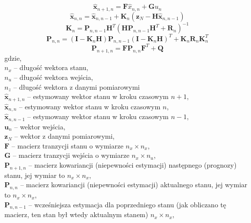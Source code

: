 {{{        \begin{equation}
            \hat{\bm{x}}_{n+1,n}= \bm{F} \hat{x}_{n,n} + \bm{G}u_n
        \end{equation}
        \begin{equation}
            \hat{\bm{x}}_{n,n}=\hat{\bm{x}}_{n,n-1}+\bm{K}_n(\bm{z}_N - \bm{H}\hat{\bm{x}}_{n,n-1})
        \end{equation}
        \begin{equation}
            \bm{K}_n=\bm{P}_{n,n-1} \bm{H}^T(\bm{H}\bm{P}_{n,n-1}\bm{H}^T +\bm{R}_n)^{-1}
        \end{equation}
        \begin{equation}
            \bm{P}_{n,n}=(\bm{I} - \bm{K}_n\bm{H}) \bm{P}_{n,n-1} (\bm{I} - \bm{K}_n\bm{H})^T + \bm{K}_n \bm{R}_n \bm{K}_n^T
        \end{equation}
        \begin{equation}
            \bm{P}_{n+1,n}=\bm{F}\bm{P}_{n,n}\bm{F}^T + \bm{Q}
        \end{equation}
        gdzie,\\
        $n_x$ -- długość wektora stanu,\\
        $n_u$ -- długość wektora wejścia,\\
        $n_z$ -- długość wektora z danymi pomiarowymi\\
        $\hat{\bm{x}}_{n+1,n}$ -- estymowany wektor stanu w kroku czasowym $n+1$,\\
        $\hat{\bm{x}}_{n,n}$ -- estymowany wektor stanu w kroku czasowym $n$,\\
        $\hat{\bm{x}}_{n,n-1}$ -- estymowany wektor stanu w kroku czasowym $n-1$,\\
        $\bm{u}_n$ -- wektor wejścia,\\
        $\bm{z}_N$ -- wektor z danymi pomiarowymi,\\
        $\bm{F}$ -- macierz tranzycji stanu o wymiarze $n_x \times n_x$,\\
        $\bm{G}$ -- macierz tranzycji wejścia o wymiarze $n_x \times n_u$,\\
        $\bm{P}_{n+1,n}$ -- macierz kowariancji (niepewności estymacji) następnego (prognozy) stanu, jej wymiar to $n_x \times n_x$,\\
        $\bm{P}_{n,n}$ -- macierz kowariancji (niepewności estymacji) aktualnego  stanu, jej wymiar to $n_x \times n_x$,\\
        $\bm{P}_{n,n-1}$ -- wcześniejsza estymacja dla poprzedniego stanu (jak obliczano tę macierz, ten stan był wtedy aktualnym stanem) $n_x \times n_x$,\\
}}}
